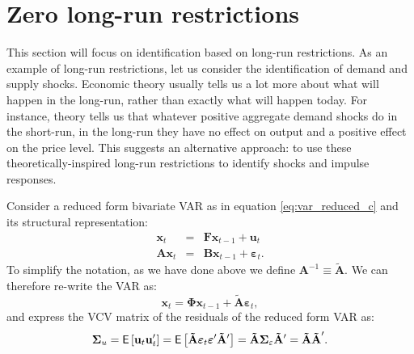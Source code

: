 \documentclass[11pt,a4paper]{report}
\numberwithin{equation}{chapter}
\numberwithin{section}{chapter}
\begin{document}
\section{Zero long-run restrictions}

This section will focus on identification based on long-run restrictions. As
an example of long-run restrictions, let us consider the \cite%
{BlanchardQuah1989} identification of demand and supply shocks. Economic
theory usually tells us a lot more about what will happen in the long-run,
rather than exactly what will happen today. For instance, theory tells us
that whatever positive aggregate demand shocks do in the short-run, in the
long-run they have no effect on output and a positive effect on the price
level. This suggests an alternative approach: to use these
theoretically-inspired long-run restrictions to identify shocks and impulse
responses.

Consider a reduced form bivariate VAR as in equation \ref{eq:var_reduced_c}
and its structural representation:%
\begin{eqnarray*}
\mathbf{x}_{t} &=&\mathbf{Fx}_{t-1}+\mathbf{u}_{t} \\
\mathbf{Ax}_{t} &=&\mathbf{Bx}_{t-1}+\mathbf{\varepsilon }_{t}.
\end{eqnarray*}%
To simplify the notation, as we have done above we define $\mathbf{A}%
^{-1}\equiv \mathbf{\tilde{A}}$. We can therefore re-write the VAR as:%
\begin{equation*}
\mathbf{x}_{t}=\mathbf{\Phi x}_{t-1}+\mathbf{\tilde{A}\varepsilon }_{t},
\end{equation*}%
and express the VCV matrix of the residuals of the reduced form VAR as:%
\begin{equation}
\mathbf{\Sigma }_{u}=\mathsf{E}\left[ \mathbf{u}_{t}\mathbf{u}_{t}^{\prime }%
\right] =\mathsf{E}\left[ \mathbf{\tilde{A}\varepsilon }_{t}\mathbf{%
\varepsilon }^{\prime }\mathbf{\tilde{A}}^{\prime }\right] =\mathbf{\tilde{A}%
\Sigma }_{\varepsilon }\mathbf{\tilde{A}}^{\prime }=\mathbf{\tilde{A}\tilde{A%
}}^{\prime }.  \label{eq:sigma_u_BQ}
\end{equation}
\end{document}
